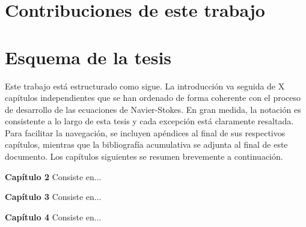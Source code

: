 





\section{Contribuciones de este trabajo}


\section{Esquema de la tesis}
Este trabajo está estructurado como sigue. La introducción va seguida de X capítulos independientes que se han ordenado de forma coherente con el proceso de desarrollo de las ecuaciones de Navier-Stokes. En gran medida, la notación es consistente a lo largo de esta tesis y cada excepción está claramente resaltada. Para facilitar la navegación, se incluyen apéndices al final de sus respectivos capítulos, mientras que la bibliografía acumulativa se adjunta al final de este documento. Los capítulos siguientes se resumen brevemente a continuación.

\textbf{Capítulo 2} Consiste en...


\textbf{Capítulo 3} Consiste en...


\textbf{Capítulo 4} Consiste en...

